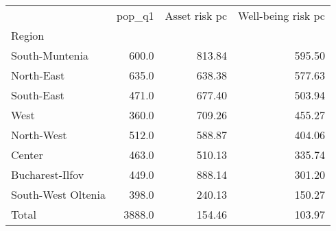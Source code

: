 \begin{tabular}{lrrr}
\toprule
{} &  pop\_q1 &  Asset risk pc &  Well-being risk pc \\
Region             &         &                &                     \\
\midrule
South-Muntenia     &   600.0 &         813.84 &              595.50 \\
North-East         &   635.0 &         638.38 &              577.63 \\
South-East         &   471.0 &         677.40 &              503.94 \\
West               &   360.0 &         709.26 &              455.27 \\
North-West         &   512.0 &         588.87 &              404.06 \\
Center             &   463.0 &         510.13 &              335.74 \\
Bucharest-Ilfov    &   449.0 &         888.14 &              301.20 \\
South-West Oltenia &   398.0 &         240.13 &              150.27 \\
Total              &  3888.0 &         154.46 &              103.97 \\
\bottomrule
\end{tabular}
